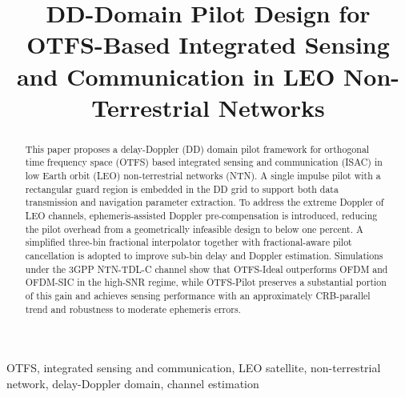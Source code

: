 ﻿\documentclass[conference]{IEEEtran}
\begin{document}
\title{DD-Domain Pilot Design for OTFS-Based Integrated Sensing and Communication in LEO Non-Terrestrial Networks}

\author{
}

\maketitle

\begin{abstract}
This paper proposes a delay-Doppler (DD) domain pilot framework for orthogonal time frequency space (OTFS) based integrated sensing and communication (ISAC) in low Earth orbit (LEO) non-terrestrial networks (NTN). A single impulse pilot with a rectangular guard region is embedded in the DD grid to support both data transmission and navigation parameter extraction. To address the extreme Doppler of LEO channels, ephemeris-assisted Doppler pre-compensation is introduced, reducing the pilot overhead from a geometrically infeasible design to below one percent. A simplified three-bin fractional interpolator together with fractional-aware pilot cancellation is adopted to improve sub-bin delay and Doppler estimation. Simulations under the 3GPP NTN-TDL-C channel show that OTFS-Ideal outperforms OFDM and OFDM-SIC in the high-SNR regime, while OTFS-Pilot preserves a substantial portion of this gain and achieves sensing performance with an approximately CRB-parallel trend and robustness to moderate ephemeris errors.
\end{abstract}

\begin{IEEEkeywords}
OTFS, integrated sensing and communication, LEO satellite, non-terrestrial network, delay-Doppler domain, channel estimation
\end{IEEEkeywords}

\end{document}
